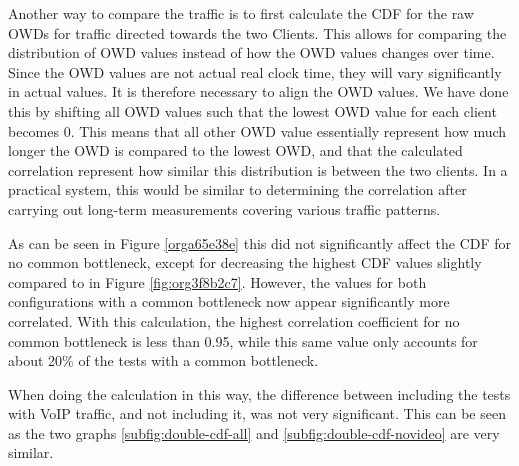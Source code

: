 \documentclass[a4paper,11pt]{article}
\begin{document}
Another way to compare the traffic is to first calculate the CDF for the raw OWDs for traffic directed towards the two Clients. This allows for comparing the distribution of OWD values instead of how the OWD values changes over time. Since the OWD values are not actual real clock time, they will vary significantly in actual values. It is therefore necessary to align the OWD values. We have done this by shifting all OWD values such that the lowest OWD value for each client becomes 0. This means that all other OWD value essentially represent how much longer the OWD is compared to the lowest OWD, and that the calculated correlation represent how similar this distribution is between the two clients. In a practical system, this would be similar to determining the correlation after carrying out long-term measurements covering various traffic patterns.

As can be seen in Figure \ref{orga65e38e} this did not significantly affect the CDF for no common bottleneck, except for decreasing the highest CDF values slightly compared to in Figure \ref{fig:org3f8b2c7}. However, the values for both configurations with a common bottleneck now appear significantly more correlated. With this calculation, the highest correlation coefficient for no common bottleneck is less than 0.95, while this same value only accounts for about 20\% of the tests with a common bottleneck.

When doing the calculation in this way, the difference between including the tests with VoIP traffic, and not including it, was not very significant. This can be seen as the two graphs \ref{subfig:double-cdf-all} and \ref{subfig:double-cdf-novideo} are very similar.
\end{document}
